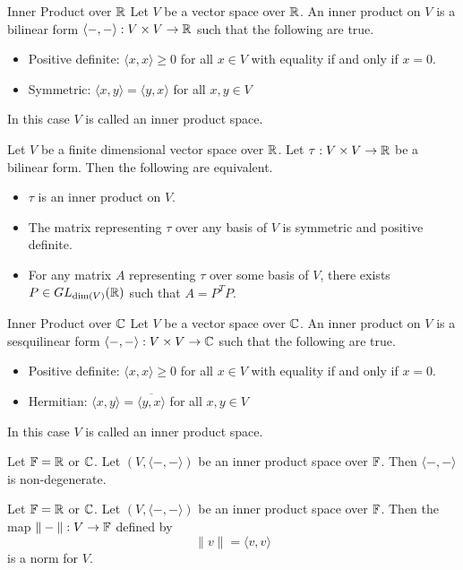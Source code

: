 \documentclass[a4paper]{article}
\begin{document}
\begin{defn}{Inner Product over $\mathbb{R}$}{} Let $V$ be a vector space over $\mathbb{R}$. An inner product on $V$ is a bilinear form $\langle-,-\rangle:V\times V\to\mathbb{R}$ such that the following are true. 
\begin{itemize}
\item Positive definite: $\langle x,x\rangle\geq0$ for all $x\in V$ with equality if and only if $x=0$. 
\item Symmetric: $\langle x,y\rangle=\langle y,x\rangle$ for all $x,y\in V$
\end{itemize}
In this case $V$ is called an inner product space. 
\end{defn}

\begin{prp}{}{} Let $V$ be a finite dimensional vector space over $\mathbb{R}$. Let $\tau:V\times V\to\mathbb{R}$ be a bilinear form. Then the following are equivalent. 
\begin{itemize}
\item $\tau$ is an inner product on $V$. 
\item The matrix representing $\tau$ over any basis of $V$ is symmetric and positive definite. 
\item For any matrix $A$ representing $\tau$ over some basis of $V$, there exists $P\in GL_{\dim(V)}(\mathbb{R})$ such that $A=P^TP$. 
\end{itemize}
\end{prp}

\begin{defn}{Inner Product over $\mathbb{C}$}{} Let $V$ be a vector space over $\mathbb{C}$. An inner product on $V$ is a sesquilinear form $\langle-,-\rangle:V\times V\to\mathbb{C}$ such that the following are true. 
\begin{itemize}
\item Positive definite: $\langle x,x\rangle\geq0$ for all $x\in V$ with equality if and only if $x=0$. 
\item Hermitian: $\langle x,y\rangle=\overline{\langle y,x\rangle}$ for all $x,y\in V$
\end{itemize}
In this case $V$ is called an inner product space. 
\end{defn}

\begin{lmm}{}{} Let $\mathbb{F}=\mathbb{R}$ or $\mathbb{C}$. Let $(V,\langle-,-\rangle)$ be an inner product space over $\mathbb{F}$. Then $\langle-,-\rangle$ is non-degenerate. 
\end{lmm}

\begin{prp}{}{} Let $\mathbb{F}=\mathbb{R}$ or $\mathbb{C}$. Let $(V,\langle-,-\rangle)$ be an inner product space over $\mathbb{F}$. Then the map $\|-\|:V\to\mathbb{F}$ defined by $$\|v\|=\langle v,v\rangle$$ is a norm for $V$. 
\end{prp}
\end{document}
